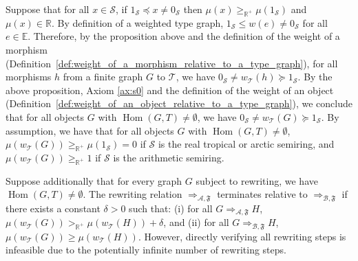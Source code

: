 
    Suppose that for all $x \in \mathcal{S}$, if $ 1_\mathcal{S} \preceq x \neq 0_\mathcal{S}$ then $\mu(x) \geq_{\mathbb{R}^+} \mu(1_\mathcal{S})$ and $\mu(x) \in \mathbb{R}$. 
    By definition of a weighted type graph, $1_\mathcal{S} \leq w(e)\neq 0_\mathcal{S}$ for all $e\in\mathbb{E}$.
    Therefore, by the proposition above and the definition of the weight of a morphism (Definition~\ref{def:weight_of_a_morphism_relative_to_a_type_graph}), for all morphisms \( h \) from a finite graph $G$ to $\mathcal{T}$, we have \( 0_\mathcal{S} \neq w_\mathcal{T}(h) \succeq 1_\mathcal{S} \). 
    By the above proposition, Axiom \eqref{ax:s0} and the definition of the weight of an object (Definition~\ref{def:weight_of_an_object_relative_to_a_type_graph}), we conclude that for all objects \( G \) with $\operatorname{Hom}(G,T)\neq \emptyset$, we have \( 0_\mathcal{S} \neq w_\mathcal{T}(G) \succeq 1_\mathcal{S} \). By assumption, we have that for all objects \( G \) with $\operatorname{Hom}(G,T)\neq \emptyset$, \( \mu(w_\mathcal{T}(G)) \geq_{\mathbb{R}^+} \mu(1_\mathcal{S}) = 0 \) if $\mathcal{S}$ is the real tropical or arctic semiring, and \( \mu(w_\mathcal{T}(G)) \geq_{\mathbb{R}^+} 1 \) if $\mathcal{S}$ is the arithmetic semiring.

Suppose additionally that for every graph $G$ subject to rewriting, we have $\operatorname{Hom}(G,T)\neq \emptyset$. The rewriting relation \( \Rightarrow_{\mathcal{A},\mathfrak{F}} \) terminates relative to $\Rightarrow_{\mathcal{B},\mathfrak{F}}$ if there exists a constant $\delta > 0$ such that: (i) for all \(G \Rightarrow_{\mathcal{A},\mathfrak{F}} H\), \( \mu(w_\mathcal{T}(G)) >_{\mathbb{R}^+} \mu(w_\mathcal{T}(H)) + \delta \), and (ii) for all \(G \Rightarrow_{\mathcal{B},\mathfrak{F}} H\), \( \mu(w_\mathcal{T}(G)) \geq \mu(w_\mathcal{T}(H)) \). However, directly verifying all rewriting steps is infeasible due to the potentially infinite number of rewriting steps.


